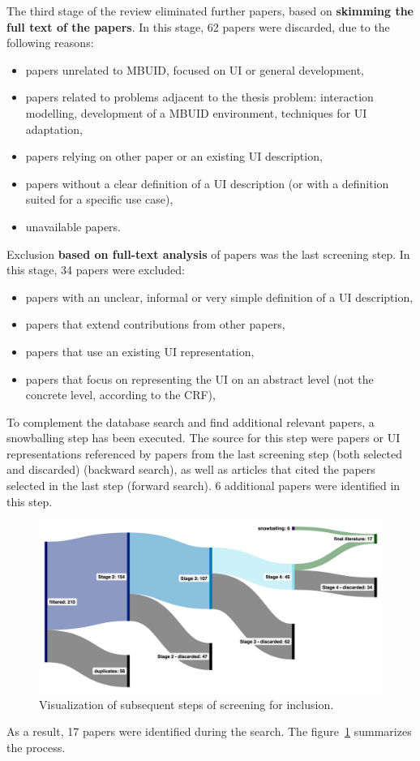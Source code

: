 The third stage of the review eliminated further papers, based on \textbf{skimming the full text of the papers}.
In this stage, 62 papers were discarded, due to the following reasons:
\begin{itemize}
    \item papers unrelated to MBUID, focused on UI or general development,
    \item papers related to problems adjacent to the thesis problem: interaction modelling, development of a MBUID environment, techniques for UI adaptation,
    \item papers relying on other paper or an existing UI description,
    \item papers without a clear definition of a UI description (or with a definition suited for a specific use case),
    \item unavailable papers.
\end{itemize}

Exclusion \textbf{based on full-text analysis} of papers was the last screening step.
In this stage, 34 papers were excluded:
\begin{itemize}
    \item papers with an unclear, informal or very simple definition of a UI description,
    \item papers that extend contributions from other papers,
    \item papers that use an existing UI representation,
    \item papers that focus on representing the UI on an abstract level (not the concrete level, according to the CRF),
\end{itemize}

To complement the database search and find additional relevant papers, a snowballing step has been executed.
The source for this step were papers or UI representations referenced by papers from the last screening step (both selected and discarded) (backward search), as well as articles that cited the papers selected in the last step (forward search).
6 additional papers were identified in this step.

\begin{figure}
    \centering
    \includegraphics[width=\textwidth]{./2-literature-review/conducting-the-search}
    \caption{Visualization of subsequent steps of screening for inclusion.}
    \label{fig:conducting-the-search-vis}
\end{figure}

As a result, 17 papers were identified during the search.
The figure~\ref{fig:conducting-the-search-vis} summarizes the process.

